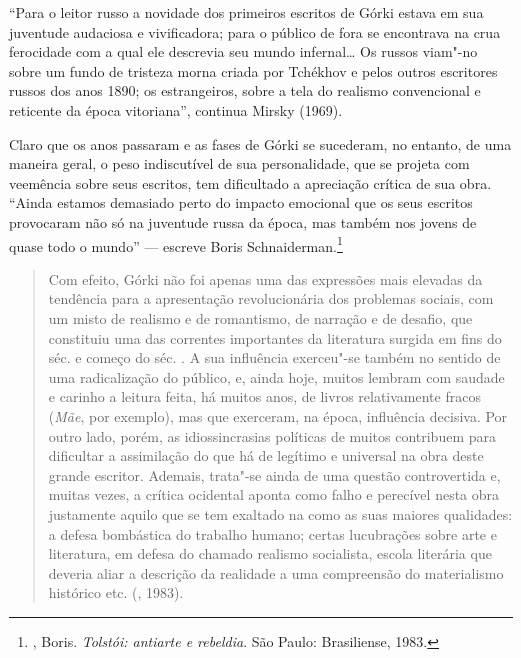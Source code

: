 ``Para o leitor russo a novidade dos primeiros escritos de Górki
estava em sua juventude audaciosa e vivificadora; para o público
de fora se encontrava na crua ferocidade com a qual ele descrevia
seu mundo infernal\ldots{} Os russos viam"-no sobre um fundo de
tristeza morna criada por Tchékhov e pelos outros escritores
russos dos anos 1890; os estrangeiros, sobre a tela do realismo
convencional e reticente da época vitoriana'', continua Mirsky
(1969).

Claro que os anos passaram e as fases de Górki se sucederam, no
entanto, de uma maneira geral, o peso indiscutível de sua
personalidade, que se projeta com veemência sobre seus escritos,
tem dificultado a apreciação crítica de sua obra. ``Ainda estamos
demasiado perto do impacto emocional que os seus escritos provocaram
não só na juventude russa da época, mas também nos jovens de quase
todo o mundo'' --- escreve Boris Schnaiderman.\footnote{,
Boris. \emph{Tolstói: antiarte e rebeldia}. São Paulo:
Brasiliense, 1983.}

\begin{quotation}
Com efeito, Górki não foi apenas uma das expressões mais elevadas
da tendência para a apresentação revolucionária dos problemas
sociais, com um misto de realismo e de romantismo, de narração e
de desafio, que constituiu uma das correntes importantes da
literatura surgida em fins do séc.  e começo do séc.
. A sua influência exerceu"-se também no sentido de
uma radicalização do público, e, ainda hoje, muitos lembram com
saudade e carinho a leitura feita, há muitos anos, de livros
relativamente fracos (\emph{Mãe}, por exemplo), mas que exerceram,
na época, influência decisiva. Por outro lado, porém, as
idiossincrasias políticas de muitos contribuem para dificultar a
assimilação do que há de legítimo e universal na obra deste grande
escritor. Ademais, trata"-se ainda de uma questão controvertida e,
muitas vezes, a crítica ocidental aponta como falho e perecível
nesta obra justamente aquilo que se tem exaltado na 
como as suas maiores qualidades: a defesa bombástica do trabalho
humano; certas lucubrações sobre arte e literatura, em defesa do
chamado realismo socialista, escola literária que deveria aliar a
descrição da realidade a uma compreensão do materialismo histórico etc. (, 1983).
\end{quotation}


